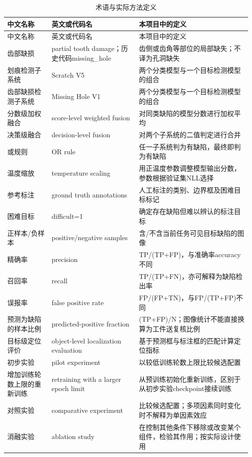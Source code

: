 \begingroup\small{}
\begin{longtable}{@{}>{\raggedright\arraybackslash}p{0.240\dimexpr\linewidth-4\tabcolsep\relax}>{\raggedright\arraybackslash}p{0.340\dimexpr\linewidth-4\tabcolsep\relax}>{\raggedright\arraybackslash}p{0.420\dimexpr\linewidth-4\tabcolsep\relax}@{}}
\caption{术语与实际方法定义}\\
\toprule
中文名称 & 英文或代码名 & 本项目中的定义 \\
\midrule\endfirsthead
\toprule
中文名称 & 英文或代码名 & 本项目中的定义 \\
\midrule\endhead
\midrule\multicolumn{3}{r}{\footnotesize 续下页}\endfoot
\bottomrule\endlastfoot
齿部缺损 & partial tooth damage；历史代码missing\_hole & 齿侧或齿角等部位的局部缺失；不译为孔洞缺失 \\
划痕检测子系统 & Scratch V5 & 两个分类模型与一个目标检测模型的组合 \\
齿部缺损检测子系统 & Missing Hole V1 & 两个分类模型与一个目标检测模型的组合 \\
分数级加权融合 & score-level weighted fusion & 对同类缺陷的模型分数进行加权平均 \\
决策级融合 & decision-level fusion & 对两个子系统的二值判定进行合并 \\
或规则 & OR rule & 任一子系统判为有缺陷，最终即判为有缺陷 \\
温度缩放 & temperature scaling & 用正温度参数调整模型输出分数，参数根据验证集NLL选择 \\
参考标注 & ground truth annotations & 人工标注的类别、边界框及困难目标标记 \\
困难目标 & difficult=1 & 确定存在缺陷但难以辨认的标注目标 \\
正样本/负样本 & positive/negative samples & 含/不含当前任务可见目标缺陷的图像 \\
精确率 & precision & TP/(TP+FP)，与准确率accuracy不同 \\
召回率 & recall & TP/(TP+FN)，亦可解释为缺陷检出率 \\
误报率 & false positive rate & FP/(FP+TN)，与FP/(TP+FP)不同 \\
预测为缺陷的样本比例 & predicted-positive fraction & (TP+FP)/N；图像统计不能直接换算为工件送复核比例 \\
目标级定位评价 & object-level localization evaluation & 基于预测框与标注框的匹配计算定位指标 \\
初步实验 & pilot experiment & 以较低训练轮数上限比较候选配置 \\
增加训练轮数上限的重新训练 & retraining with a larger epoch limit & 从预训练初始化重新训练，区别于从初步实验checkpoint接续训练 \\
对照实验 & comparative experiment & 比较候选配置；多项因素同时变化时不解释为单因素效应 \\
消融实验 & ablation study & 在控制其他条件下移除或改变某个组件，检验其作用；按实际设计使用 \\
\end{longtable}\endgroup

